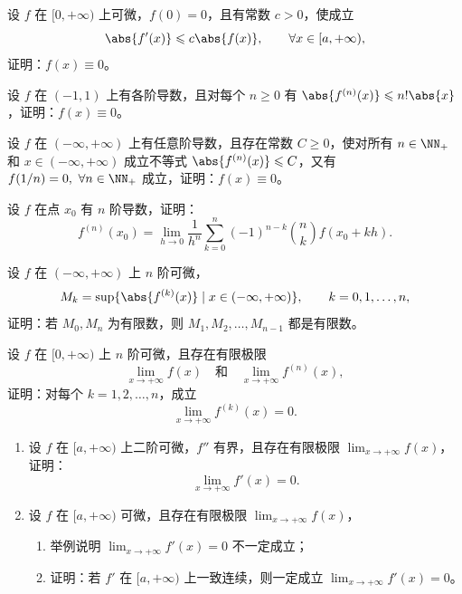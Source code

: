 \begin{xreferenceproblem}
设 $f$ 在 $[0,+\infty)$ 上可微，$f(0)=0$，且有常数 $c>0$，使成立
\[
  \abs{f'(x)}\leqslant c\abs{f(x)},\qquad \forall x\in[a,+\infty),
\]
证明：$f(x)\equiv0$。
\end{xreferenceproblem}

\begin{xreferenceproblem}[12]
设 $f$ 在 $(-1,1)$ 上有各阶导数，且对每个 $n\geqslant0$ 有 $\abs{f^{(n)}(x)}\leqslant n!\abs{x}$，证明：$f(x)\equiv0$。
\end{xreferenceproblem}

\begin{xreferenceproblem}[13]
设 $f$ 在 $(-\infty,+\infty)$ 上有任意阶导数，且存在常数 $C\geqslant0$，使对所有 $n\in\NN_+$ 和 $x\in(-\infty,+\infty)$ 成立不等式 $\abs{f^{(n)}(x)}\leqslant C$，又有 $f(1/n)=0,\ \forall n\in\NN_+$ 成立，证明：$f(x)\equiv0$。
\end{xreferenceproblem}

\begin{xreferenceproblem}[14]
设 $f$ 在点 $x_0$ 有 $n$ 阶导数，证明：
\[
  f^{(n)}(x_0)=\lim_{h\to0}\frac{1}{h^n}\sum_{k=0}^n(-1)^{n-k}\binom nk f(x_0+kh).
\]
\end{xreferenceproblem}

\begin{xreferenceproblem}[15]
设 $f$ 在 $(-\infty,+\infty)$ 上 $n$ 阶可微，
\[
  M_k=\sup\{\abs{f^{(k)}(x)}\mid x\in(-\infty,+\infty)\},\qquad k=0,1,\ldots,n,
\]
证明：若 $M_0,M_n$ 为有限数，则 $M_1,M_2,\ldots,M_{n-1}$ 都是有限数。
\end{xreferenceproblem}

\begin{xreferenceproblem}[16]
设 $f$ 在 $[0,+\infty)$ 上 $n$ 阶可微，且存在有限极限
\[
  \lim_{x\to+\infty}f(x)\quad\text{和}\quad\lim_{x\to+\infty}f^{(n)}(x),
\]
证明：对每个 $k=1,2,\ldots,n$，成立
\[
  \lim_{x\to+\infty}f^{(k)}(x)=0.
\]
\end{xreferenceproblem}

\begin{xreferenceproblem}[17]
\begin{enumerate}[label=(\arabic*)]
  \item 设 $f$ 在 $[a,+\infty)$ 上二阶可微，$f''$ 有界，且存在有限极限 $\lim_{x\to+\infty}f(x)$，证明：
  \[
    \lim_{x\to+\infty}f'(x)=0.
  \]
  \item 设 $f$ 在 $[a,+\infty)$ 可微，且存在有限极限 $\lim_{x\to+\infty}f(x)$，
  \begin{enumerate}[label=(\roman*)]
    \item 举例说明 $\lim_{x\to+\infty}f'(x)=0$ 不一定成立；
    \item 证明：若 $f'$ 在 $[a,+\infty)$ 上一致连续，则一定成立 $\lim_{x\to+\infty}f'(x)=0$。
  \end{enumerate}
\end{enumerate}
\end{xreferenceproblem}

